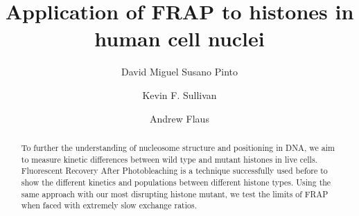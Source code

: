 \documentclass[a4paper,oneside,onecolumn,article,draft]{memoir}
\author{David Miguel Susano Pinto \and Kevin F. Sullivan \and Andrew Flaus}
\title{Application of FRAP to histones in human cell nuclei}
\begin{document}
  \maketitle

  \begin{abstract}
    To further the understanding of nucleosome structure and positioning
    in DNA, we aim to measure kinetic differences between wild type and
    mutant histones in live cells. Fluorescent Recovery After Photobleaching
    is a technique successfully used before to show the different kinetics and
    populations between different histone types. Using the same approach with
    our most disrupting histone mutant, we test the limits of FRAP when
    faced with extremely slow exchange ratios.
  \end{abstract}

  
  
  
  
  
\end{document}

